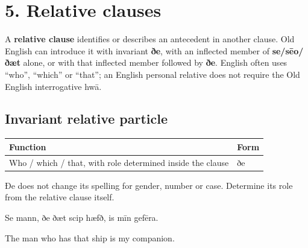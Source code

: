 \section*{5. Relative clauses}

A \textbf{relative clause} identifies or describes an antecedent in another clause. Old English can introduce it with invariant \textbf{ðe}, with an inflected member of \textbf{se/\allowbreak{}sēo/\allowbreak{}ðæt} alone, or with that inflected member followed by \textbf{ðe}. English often uses “who”, “which” or “that”; an English personal relative does not require the Old English interrogative hwā.

\subsection*{Invariant relative particle}

\par\begingroup
\fontsize{10.5}{13.2}\selectfont
\setlength{\LTleft}{0pt}\setlength{\LTright}{\fill}
\noindent
\begin{tabular}{@{}>{\raggedright\arraybackslash}p{92.06mm}>{\raggedright\arraybackslash}p{29.13mm}@{}}
\toprule
\textbf{Function} & \textbf{Form} \\
\midrule
Who /\allowbreak{} which /\allowbreak{} that, with role determined inside the clause & ðe \\
\bottomrule
\end{tabular}
\par\endgroup

Ðe does not change its spelling for gender, number or case. Determine its role from the relative clause itself.

Se mann, ðe ðæt scip hæfð, is mīn gefēra.

The man who has that ship is my companion.

